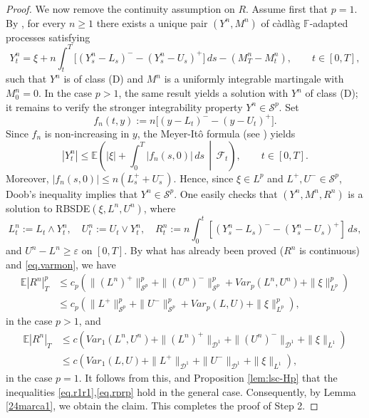 \documentclass[11pt,a4paper,reqno]{amsart}
\theoremstyle{definition}
\numberwithin{equation}{section}
\begin{document}
\begin{proof}
We now remove the continuity assumption on $R$.
Assume first that $p=1$. By \cite[Theorem 2.7]{KR:JFA}, for every
$n\geq1$ there exists a unique pair $(Y^n,M^n)$ of c\`adl\`ag
$\mathbb F$-adapted processes satisfying
\[
Y^n_t
=
\xi+n\int_t^T
\big[(Y^n_s-L_s)^--(Y^n_s-U_s)^+\big]\,ds
-(M^n_T-M^n_t),
\qquad t\in[0,T],
\]
such that $Y^n$ is of class \textnormal{(D)} and $M^n$ is a uniformly
integrable martingale with $M^n_0=0$.
In the case $p>1$, the same result yields a solution with $Y^n$ of
class \textnormal{(D)}; it remains to verify the stronger integrability
property $Y^n\in\mathcal S^p$. Set
\[
f_n(t,y):=
n\big[(y-L_t)^--(y-U_t)^+\big].
\]
Since $f_n$ is non-increasing in $y$,  the Meyer-It\^o  formula (see \cite[Theorem IV.70]{Protter}) yields
\[
|Y_t^n|
\leq
\mathbb E\left(
|\xi|+\int_0^T|f_n(s,0)|\,ds
\,\middle|\,\mathcal F_t
\right),
\qquad t\in[0,T].
\]
Moreover, $|f_n(s,0)|\leq n(L_s^++U_s^-)$.
Hence, since $\xi\in L^p$ and
$L^+,U^-\in\mathcal S^p$, Doob's inequality implies that
$Y^n\in\mathcal S^p$.
One easily checks that $(Y^{n},M^{n},R^{n})$ is a solution to RBSDE$(\xi,L^{n},U^{n})$, where
\[
L^{n}_t:= L_t\wedge Y^{n}_t,\quad U^{n}_t:= U_t\vee Y^{n}_t,\quad 
R^{n}_t:= n\int_0^t[(Y^{n}_s-L_s)^--(Y^{n}_s-U_s)^+]\,ds,
\]
and $U^{n}-L^{n}\ge \varepsilon$ on $[0,T]$.
By what has already been  proved ($R^{n}$ is continuous) and \eqref{eq.varmon},
we have 
\[
\begin{split}
\mathbb E|R^{n}|_T^p&\le c_p(\|(L^{n})^+\|_{\mathcal S^p}^p+\|(U^{n})^-\|_{\mathcal S^p}^p
+ Var_p(L^{n},U^{n})+\|\xi\|^p_{L^p})\\&\le c_p(\|L^+\|_{\mathcal S^p}^p+\|U^-\|_{\mathcal S^p}^p
+ Var_p(L,U)+\|\xi\|^p_{L^p}),
\end{split}
\]
in the case $p>1$, and 
\[
\begin{split}
\mathbb E|R^{n}|_T&\le 
c\left(Var_1(L^{n},U^{n})+\|(L^{n})^+\|_{\mathcal D^1}+\|(U^{n})^-\|_{\mathcal D^1}+\|\xi\|_{L^1}\right)
\\&\le c\left(Var_1(L,U)+ \|L^+\|_{\mathcal D^1}+\|U^-\|_{\mathcal D^1}+\|\xi\|_{L^1}\right),
\end{split}
\]
in the case $p=1$.
It follows from this,  \cite[Corollary 3.12]{K:SPA2} and Proposition  \ref{lem:lsc-Hp} 
that the  inequalities \eqref{eq.r1r1},\eqref{eq.rprp} hold
in the general case. 
Consequently,  by  Lemma \ref{24marca1}, we obtain the claim.
This completes the proof of Step 2.


\end{proof}
\end{document}
